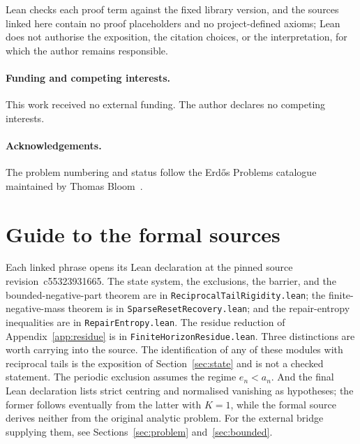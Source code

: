 \documentclass[11pt]{article}
\renewcommand{\commitshort}{c55323931665}
\begin{document}
Lean checks each proof term against the fixed library
version, and the sources linked here contain no proof placeholders and no
project-defined axioms; Lean does not authorise the exposition, the citation
choices, or the interpretation, for which the author remains responsible.

\paragraph{Funding and competing interests.} This work received no external
funding.  The author declares no competing interests.

\paragraph{Acknowledgements.} The problem numbering and status follow the
Erd\H{o}s Problems catalogue maintained by Thomas Bloom~\cite{erdosproblems}.

\appendix
\section{Guide to the formal sources}\label{app:index}

Each linked phrase opens its Lean declaration at the pinned source
revision~\commitshort.  The state system, the exclusions, the barrier, and the
bounded-negative-part theorem are in \texttt{ReciprocalTailRigidity.lean}; the
finite-negative-mass theorem is in \texttt{SparseResetRecovery.lean}; and the
repair-entropy inequalities are in \texttt{RepairEntropy.lean}.  The residue
reduction of Appendix~\ref{app:residue} is in
\texttt{FiniteHorizonResidue.lean}.  Three distinctions are worth carrying into
the source.  The
identification of any of these modules with reciprocal tails is the exposition
of Section~\ref{sec:state} and is not a checked statement.  The periodic exclusion
assumes the regime $e_n<a_n$.  And the final Lean declaration lists strict
centring and normalised vanishing as hypotheses; the former follows eventually
from the latter with $K=1$, while the formal source derives neither from the
original analytic problem.  For the external bridge supplying them,
see Sections~\ref{sec:problem} and~\ref{sec:bounded}.

\iffalse
\end{document}
